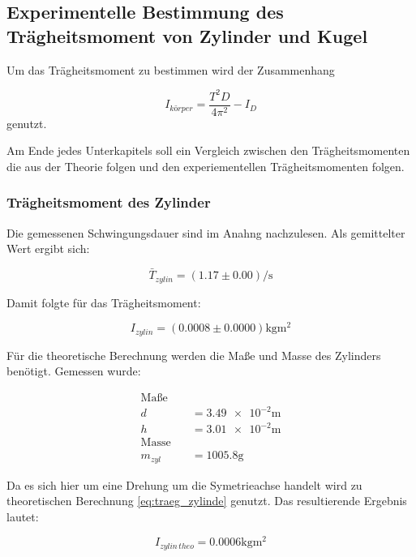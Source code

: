 \subsection{Experimentelle Bestimmung des Trägheitsmoment von Zylinder und Kugel}

Um das Trägheitsmoment zu bestimmen wird der Zusammenhang

\begin{equation*}
I_{körper}=\frac{T^2 D}{4\pi^2}-I_D
\end{equation*}
genutzt.

Am Ende jedes Unterkapitels soll ein Vergleich zwischen 
den Trägheitsmomenten die aus der Theorie folgen und den 
experiementellen Trägheitsmomenten folgen.

\subsubsection{Trägheitsmoment des Zylinder}

Die gemessenen Schwingungsdauer sind im Anahng nachzulesen.
Als gemittelter Wert ergibt sich:

\begin{equation*}
\bar{T}_{zylin}=\left(\num{1.17}\pm\num{0.00}\right) \si{\per\second}
\end{equation*}

Damit folgte für das Trägheitsmoment:

\begin{equation}
\label{eq:traeg_zylinder_grau_exp}
I_{zylin}=\left(\num{0.0008}\pm\num{0.0000}\right) \si{\kilogram\meter\squared}
\end{equation}

Für die theoretische Berechnung werden die Maße und Masse des Zylinders benötigt. 
Gemessen wurde:

\begin{align*}
\text{Maße} \quad &\\
d&=\num{3.49e-2}\si{\meter}\\
h&=\num{3.01e-2}\si{\meter}\\
\text{Masse} \quad &\\
m_{zyl}&=\num{1005.8}\si{\gram}
\end{align*}

Da es sich hier um eine Drehung um die Symetrieachse handelt wird zu
theoretischen Berechnung \eqref{eq:traeg_zylinde} genutzt.
Das resultierende Ergebnis lautet:

\begin{equation}
\label{eq:traeg_zylinder_theo}
I_{zylin \,theo}= \num{0.0006}\si{\kilogram\meter\squared}
\end{equation}

